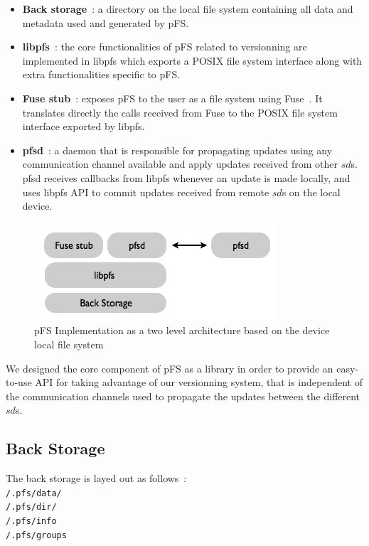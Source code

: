 \begin {itemize}
\item \textbf{Back storage}~: a directory on the local file system
  containing all data and metadata used and generated by pFS.
\item \textbf{libpfs}~: the core functionalities of pFS related to
  versionning are implemented in libpfs which exports a POSIX file
  system interface along with extra functionalities specific to
  pFS.
\item \textbf{Fuse stub}~: exposes pFS to the user as a file system
  using Fuse~\cite{henk:fuse}. It translates directly the calls
  received from Fuse to the POSIX file system interface exported by
  libpfs.
\item \textbf{pfsd}~: a daemon that is responsible for propagating
  updates using any communication channel available and apply updates
  received from other $sd$s. pfsd receives callbacks from libpfs
  whenever an update is made locally, and uses libpfs API to commit
  updates received from remote $sd$s on the local device.
\end {itemize}

\begin{figure}[ht]
\begin{center}
  \includegraphics [scale=0.6] {img/impl}
  \caption{\label{PfsImpl} {\small pFS Implementation as a two level
      architecture based on the device local file system}}
\end{center}
\end{figure}

We designed the core component of pFS as a library in order to provide
an easy-to-use API for taking advantage of our versionning system, that
is independent of the communication channels used to propagate the
updates between the different $sd$s.

\subsection {Back Storage}

The back storage is layed out as follows~: \\ 
{\tt /.pfs/data/} \\ 
{\tt /.pfs/dir/} \\ 
{\tt /.pfs/info} \\ 
{\tt /.pfs/groups} \\

